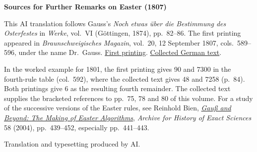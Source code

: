 \clearpage\thispagestyle{empty}
\begin{center}\textbf{Sources for Further Remarks on Easter (1807)}\end{center}
\noindent This AI translation follows Gauss’s \textit{Noch etwas über die Bestimmung des Osterfestes} in \textit{Werke}, vol.~VI (Göttingen, 1874), pp.~82--86. The first printing appeared in \textit{Braunschweigisches Magazin}, vol.~20, 12 September 1807, cols.~589--596, under the name Dr.~Gauss. \href{https://www.digitale-sammlungen.de/de/view/bsb10531610?page=303}{First printing}. \href{https://gdz.sub.uni-goettingen.de/id/PPN236007467}{Collected German text}.
\par\smallskip\noindent In the worked example for 1801, the first printing gives 90 and 7300 in the fourth-rule table (col.~592), where the collected text gives 48 and 7258 (p.~84). Both printings give 6 as the resulting fourth remainder. The collected text supplies the bracketed references to pp.~75, 78 and 80 of this volume. For a study of the successive versions of the Easter rules, see Reinhold Bien, \href{https://doi.org/10.1007/s00407-004-0078-5}{\textit{Gauß and Beyond: The Making of Easter Algorithms}}, \textit{Archive for History of Exact Sciences} 58 (2004), pp.~439--452, especially pp.~441--443.
\par\smallskip\noindent Translation and typesetting produced by AI.
\clearpage
